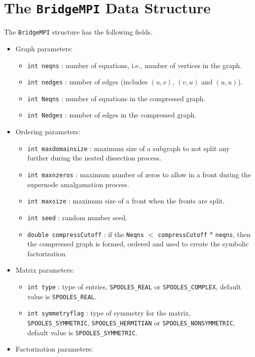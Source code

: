 \section{The \texttt{BridgeMPI} Data Structure}
\label{section:BridgeMPI:dataStructure}
\par
The {\tt BridgeMPI} structure has the following fields.
\begin{itemize}
%
\item Graph parameters:
\begin{itemize} 
\item
{\tt int neqns} : number of equations, 
i.e., number of vertices in the graph.
\item
{\tt int nedges} : number of edges 
(includes $(u,v)$, $(v,u)$ and $(u,u)$).
\item
{\tt int Neqns} : number of equations in the compressed graph.
\item
{\tt int Nedges} : number of edges in the compressed graph.
\end{itemize}
%
\item Ordering parameters:
\begin{itemize}
\item
{\tt int maxdomainsize} : maximum size of a subgraph to not split any
further during the nested dissection process.
\item
{\tt int maxnzeros} : maximum number of zeros to allow in a front 
during the supernode amalgamation process.
\item
{\tt int maxsize} : maximum size of a front when the fronts are split.
\item
{\tt int seed} : random number seed.
\item
{\tt double compressCutoff} : if the \texttt{Neqns} $<$
\texttt{compressCutoff} $*$ \texttt{neqns}, then the compressed
graph is formed, ordered and used to create the symbolic
factorization.
\end{itemize}
%
\item Matrix parameters:
\begin{itemize}
\item
{\tt int type} : type of entries,
{\tt SPOOLES\_REAL} or {\tt SPOOLES\_COMPLEX},
default value is {\tt SPOOLES\_REAL}.
\item
{\tt int symmetryflag} : type of symmetry for the matrix,
{\tt SPOOLES\_SYMMETRIC}, {\tt SPOOLES\_HERMITIAN}
or {\tt SPOOLES\_NONSYMMETRIC},
default value is {\tt SPOOLES\_SYMMETRIC}.
\end{itemize}
%
\item Factorization parameters:

\end{itemize}
